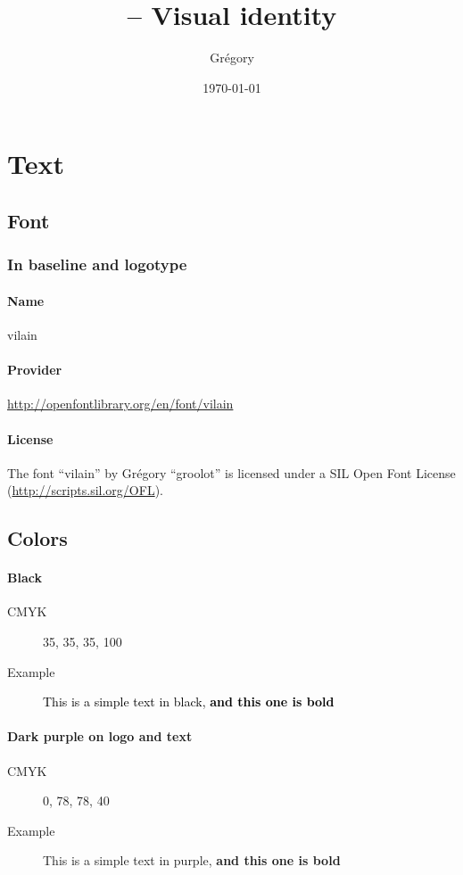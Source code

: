 \documentclass[a4paper,oneside]{article}
\author{Grégory \bsc{David}}
\title{\vilain{} -- Visual identity}
\date{\today{}}
\begin{document}
\maketitle{}
\tableofcontents{}

\newpage
\section{Text}
\subsection{Font}
\subsubsection{In baseline and logotype}
\paragraph{Name} vilain
\paragraph{Provider}
\url{http://openfontlibrary.org/en/font/vilain}
\paragraph{License} The font “vilain” by Grégory ``groolot''
 is licensed under a SIL Open Font License
(\url{http://scripts.sil.org/OFL}).

\subsection{Colors}
\paragraph{Black}
\begin{description}
    \item[CMYK] 35, 35, 35, 100
    \item[Example] \textcolor{black}{This is a simple text in
  black, \textbf{and this one is bold}}
\end{description}

\paragraph{Dark purple on logo and text}
\begin{description}
    \item[CMYK] 0, 78, 78, 40
    \item[Example] \textcolor{vilainRed}{This is a simple text in
  purple, \textbf{and this one is bold}}
\end{description}
\end{document}
